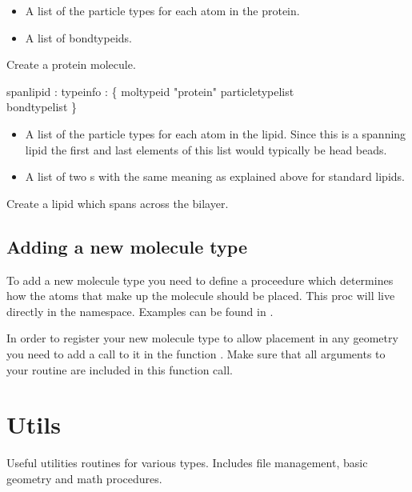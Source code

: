 \begin{itemize}
          \item {} A list of the particle types for each atom in the protein.
          \item {} A list of bondtypeids.
\end{itemize}
Create a protein molecule.
\begin{code}
  spanlipid : typeinfo : \{ moltypeid "protein" particletypelist\\
              bondtypelist \}
\end{code}
\begin{itemize}
\item {} A list of the particle types for each atom in the lipid. Since this is a spanning lipid the first and last elements of this list would typically be head beads.
\item {} A list of two s with the same meaning as explained above for standard lipids.
\end{itemize}
Create a lipid which spans across the bilayer.

\subsection{Adding a new molecule type}

To add a new molecule type you need to define a proceedure which determines how the atoms that make up the molecule should be placed. This proc will live directly in the   namespace. Examples can be found in .

In order to register your new molecule type to allow placement in any geometry you need to add a call to it in the function . Make sure that all arguments to your  routine are included in this function call. 


\section{Utils}

Useful utilities routines for various types. Includes file management, basic geometry and math procedures.

